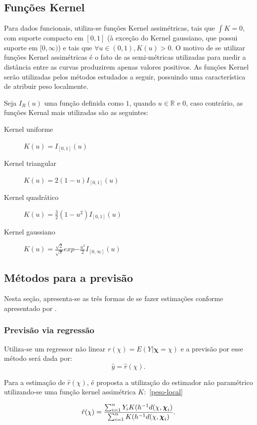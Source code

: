 \documentclass[
	12pt,				%
	openright,			%
	oneside,			%
	a4paper,			%
	english,			%
	brazil				%
	]{dissertacao-ufrgs-abntex2}
\begin{document}
\subsection{Funções Kernel}

Para dados funcionais, utiliza-se funções Kernel assimétricas, tais que $\int K = 0$, com suporte compacto em $[0,1]$ (à exceção do Kernel gaussiano, que possui suporte em $[0,\infty)$) e tais que $\forall u \in (0,1), K(u) > 0$. O motivo de se utilizar funções Kernel assimétricas é o fato de as semi-métricas utilizadas para medir a distância entre as curvas produzirem apenas valores positivos. As funções Kernel serão utilizadas pelos métodos estudados a seguir, possuindo uma característica de atribuir peso localmente.

Seja $I_R(u)$ uma função definida como $1$, quando $u \in \mathbb{R}$ e 0, caso contrário, as funções Kernal mais utilizadas são as seguintes:
\begin{description}
	\item[Kernel uniforme] $K(u)= I_{[0,1]}(u)$
    \item[Kernel triangular] $K(u)= 2(1-u)I_{[0,1]}(u)$
    \item[Kernel quadrático] $K(u)= \frac {3}{2} (1 - u^2) I_{[0,1]}(u)$
    \item[Kernel gaussiano] $K(u)= \frac {\sqrt{2}}{\sqrt{\pi}} exp{-\frac{u^2}{2}} I_{[0,\infty]}(u)$
\end{description}

\subsection{Métodos para a previsão}
\label{metodos-previsao-npfda}

Nesta seção, apresenta-se as três formas de se fazer estimações conforme apresentado por .


\subsubsection*{Previsão via regressão}

Utiliza-se um regressor não linear $r(\chi)=E(Y|\boldsymbol{\chi}=\chi)$
e a previsão por esse método será dada por:
\[
\hat{y}=\hat{r}(\chi).
\]

Para a estimação de $\hat{r}(\chi)$, é proposta a utilização do estimador
não paramétrico utilizando-se uma função kernel assimétrica $K$:~\ref{peso-local}

\begin{equation}
\hat{r}(\chi)=\frac{\sum_{i=1}^{n}Y_{i}K(h^{-1}d(\chi,\boldsymbol{\chi}_{i})}{\sum_{i=1}^{n}K(h^{-1}d(\chi,\boldsymbol{\chi}_{i})}.
\end{equation}
\end{document}
